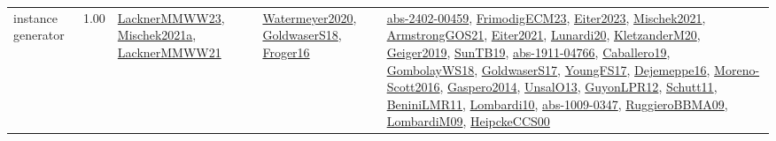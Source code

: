 {\begin{longtable}{p{3cm}r>{\raggedright\arraybackslash}p{6cm}>{\raggedright\arraybackslash}p{6cm}>{\raggedright\arraybackslash}p{8cm}}
\index{instance generator}\index{Benchmarks!instance generator}instance generator &  1.00 & \hyperref[detail:LacknerMMWW23]{LacknerMMWW23}, \hyperref[detail:Mischek2021a]{Mischek2021a}, \hyperref[detail:LacknerMMWW21]{LacknerMMWW21} & \hyperref[detail:Watermeyer2020]{Watermeyer2020}, \hyperref[detail:GoldwaserS18]{GoldwaserS18}, \hyperref[detail:Froger16]{Froger16} & \hyperref[detail:abs-2402-00459]{abs-2402-00459}, \hyperref[detail:FrimodigECM23]{FrimodigECM23}, \hyperref[detail:Eiter2023]{Eiter2023}, \hyperref[detail:Mischek2021]{Mischek2021}, \hyperref[detail:ArmstrongGOS21]{ArmstrongGOS21}, \hyperref[detail:Eiter2021]{Eiter2021}, \hyperref[detail:Lunardi20]{Lunardi20}, \hyperref[detail:KletzanderM20]{KletzanderM20}, \hyperref[detail:Geiger2019]{Geiger2019}, \hyperref[detail:SunTB19]{SunTB19}, \hyperref[detail:abs-1911-04766]{abs-1911-04766}, \hyperref[detail:Caballero19]{Caballero19}, \hyperref[detail:GombolayWS18]{GombolayWS18}, \hyperref[detail:GoldwaserS17]{GoldwaserS17}, \hyperref[detail:YoungFS17]{YoungFS17}, \hyperref[detail:Dejemeppe16]{Dejemeppe16}, \hyperref[detail:Moreno-Scott2016]{Moreno-Scott2016}, \hyperref[detail:Gaspero2014]{Gaspero2014}, \hyperref[detail:UnsalO13]{UnsalO13}, \hyperref[detail:GuyonLPR12]{GuyonLPR12}, \hyperref[detail:Schutt11]{Schutt11}, \hyperref[detail:BeniniLMR11]{BeniniLMR11}, \hyperref[detail:Lombardi10]{Lombardi10}, \hyperref[detail:abs-1009-0347]{abs-1009-0347}, \hyperref[detail:RuggieroBBMA09]{RuggieroBBMA09}, \hyperref[detail:LombardiM09]{LombardiM09}, \hyperref[detail:HeipckeCCS00]{HeipckeCCS00}\\

\end{longtable}}
